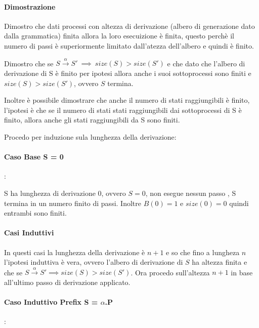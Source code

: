 \documentclass{article}
\newcommand{\passo}{\xrightarrow{\alpha}}
\begin{document}
\paragraph{Dimostrazione} %

Dimostro che dati processi con altezza di derivazione (albero di generazione dato dalla grammatica) finita allora la loro esecuizione è finita, questo perchè il numero di passi è superiormente limitato dall'atezza dell'albero e quindi è finito. 

Dimostro che se $ S \passo  S' ~ \implies ~ size(S) > size(S') $ e che dato che l'albero di derivazione di S è finito per ipotesi allora anche i suoi sottoprocessi sono finiti e $size(S)>size(S')$, ovvero $S$ termina.

Inoltre è possibile dimostrare che anche il numero di stati raggiungibili è finito, l'ipotesi è che se il numero di stati stati raggiungibili dai sottoprocessi di S è finito, allora anche gli stati raggiungibili da S sono finiti.

Procedo per induzione sula lunghezza della derivazione:

\paragraph{Caso Base S = 0}: 

S ha lunghezza di derivazione 0, ovvero $S=0$, non esegue nessun passo%
, S termina in un numero finito di passi. Inoltre $B(0) = 1$ e $size(0) = 0$ quindi entrambi sono finiti.

\paragraph{Casi Induttivi }

In questi casi la lunghezza della derivazione è $n+1$ e so che fino a lungheza $n$ l'ipotesi induttiva è vera, ovvero l'albero di derivazione di $S$ ha altezza finita e che se $S \passo S' \implies size(S)>size(S')$. Ora procedo sull'altezza $n+1$ in base all'ultimo passo di derivazione applicato.

\paragraph{Caso Induttivo Prefix S = $\alpha$.P}:
\end{document}
